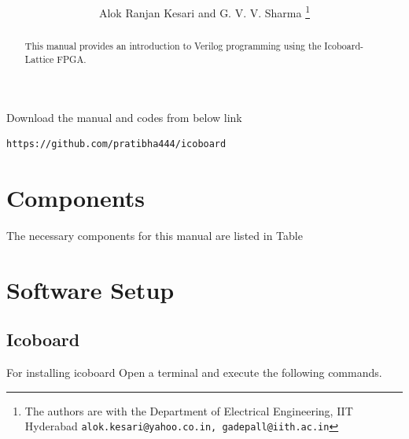\documentclass[journal,12pt,twocolumn]{IEEEtran}
\begin{document}
     \def\rightbox#1{\makebox[0in][r]{#1}}
     \def\centbox#1{\makebox[0in]{#1}}
     \def\topbox#1{\raisebox{-\baselineskip}[0in][0in]{#1}}
     \def\midbox#1{\raisebox{-0.5\baselineskip}[0in][0in]{#1}}
\vspace{3cm}
\title{
}%
\author{Alok Ranjan Kesari and G. V. V. Sharma%
\thanks{ The authors are with the Department of Electrical Engineering, IIT Hyderabad
        {\tt\small alok.kesari@yahoo.co.in, gadepall@iith.ac.in}}%
}
\tableofcontents
 
\begin{abstract}
This manual provides an introduction to Verilog programming using the Icoboard-Lattice FPGA.
\end{abstract}
Download the manual and codes from below link
\begin{lstlisting}
https://github.com/pratibha444/icoboard
\end{lstlisting}
\section{Components}
The necessary components for this manual are listed in Table 
\begin{table}[!h]
\centering

\caption{}
\label{table:components}
\end{table}
\section{Software Setup}
\subsection{Icoboard}
For installing icoboard
Open a terminal and execute the following commands.
\end{document}
